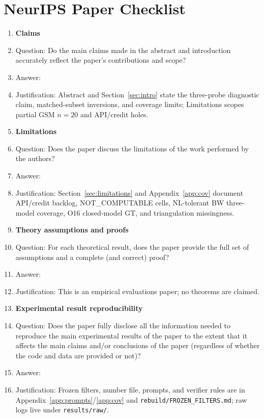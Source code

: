 \section*{NeurIPS Paper Checklist}

\begin{enumerate}

\item {\bf Claims}
    \item[] Question: Do the main claims made in the abstract and introduction accurately reflect the paper's contributions and scope?
    \item[] Answer: \answerYes{}
    \item[] Justification: Abstract and Section~\ref{sec:intro} state the three-probe diagnostic claim, matched-subset inversions, and coverage limits; Limitations scopes partial GSM $n{=}20$ and API/credit holes.

\item {\bf Limitations}
    \item[] Question: Does the paper discuss the limitations of the work performed by the authors?
    \item[] Answer: \answerYes{}
    \item[] Justification: Section~\ref{sec:limitations} and Appendix~\ref{app:cov} document API/credit backlog, NOT\_COMPUTABLE cells, NL-tolerant BW three-model coverage, O16 closed-model GT, and triangulation missingness.

\item {\bf Theory assumptions and proofs}
    \item[] Question: For each theoretical result, does the paper provide the full set of assumptions and a complete (and correct) proof?
    \item[] Answer: \answerNA{}
    \item[] Justification: This is an empirical evaluations paper; no theorems are claimed.

\item {\bf Experimental result reproducibility}
    \item[] Question: Does the paper fully disclose all the information needed to reproduce the main experimental results of the paper to the extent that it affects the main claims and/or conclusions of the paper (regardless of whether the code and data are provided or not)?
    \item[] Answer: \answerYes{}
    \item[] Justification: Frozen filters, number file, prompts, and verifier rules are in Appendix~\ref{app:prompts}/\ref{app:cov} and \texttt{rebuild/FROZEN\_FILTERS.md}; raw logs live under \texttt{results/raw/}.


\end{enumerate}
